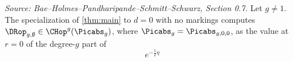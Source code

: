 \begin{theorem}
  \label{thm:universal_deg0}
  \textit{Source: Bae--Holmes--Pandharipande--Schmitt--Schwarz, Section 0.7.}
  Let $g \neq 1$.  The specialization of \cref{thm:main} to $d = 0$ with no markings
  computes $\DRop_{g,\emptyset} \in \CHop^g(\Picabs_g)$, where $\Picabs_g = \Picabs_{g,0,0}$,
  as the value at $r = 0$ of the degree-$g$ part of
  \[
    e^{-\frac{1}{2}\eta}
\]
\end{theorem}
